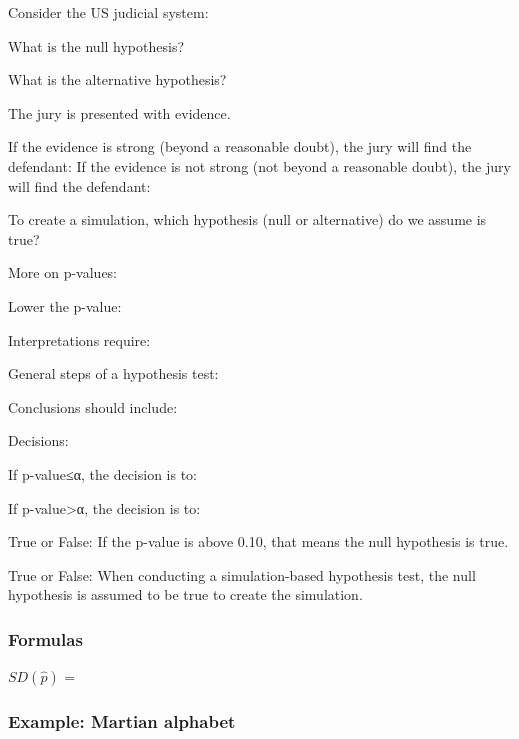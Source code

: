 \documentclass[
]{report}
\newcommand{\rgs}{\vspace{12pt}} %
\newcommand{\rgi}{\hspace{24pt}}  %
\begin{document}
Consider the US judicial system:

\rgi What is the null hypothesis?\\
\rgs

\rgi What is the alternative hypothesis?
\rgs

\rgi The jury is presented with evidence.\\
\rgs

If the evidence is strong (beyond a reasonable doubt), the jury will find the defendant:
If the evidence is not strong (not beyond a reasonable doubt), the jury will find the defendant:
\rgs

To create a simulation, which hypothesis (null or alternative) do we assume is true?
\rgs

More on p-values:

\rgi Lower the p-value:
\rgs

\rgi Interpretations require:
\rgs

General steps of a hypothesis test:
\rgs

Conclusions should include:
\rgs

Decisions:

\rgi If p-value≤α, the decision is to:

\rgi If p-value\textgreater α, the decision is to:

True or False: If the p-value is above 0.10, that means the null hypothesis is true.

True or False: When conducting a simulation-based hypothesis test, the null hypothesis is assumed to be true to create the simulation.

\hypertarget{formulas}{%
\subsubsection*{Formulas}\label{formulas}}

\(SD(\hat{p})\) =
\rgs

\hypertarget{example-martian-alphabet}{%
\subsubsection*{Example: Martian alphabet}\label{example-martian-alphabet}}
\end{document}
